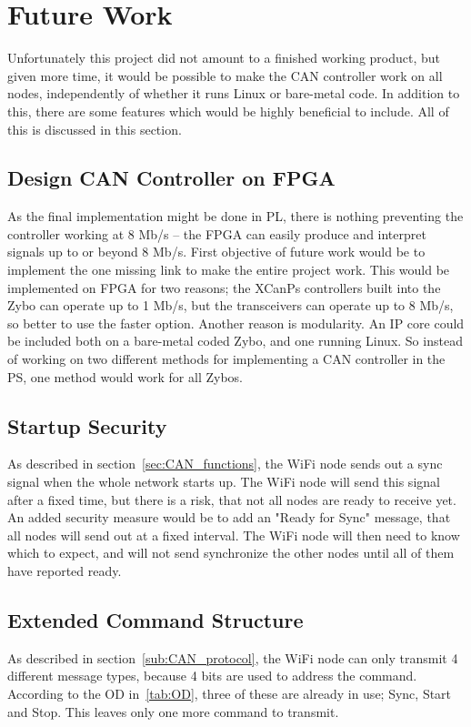 
\section{Future Work}\label{sec:future_work}
Unfortunately this project did not amount to a finished working product, but given more time, it would be possible to make the CAN controller work on all nodes, independently of whether it runs Linux or bare-metal code.
In addition to this, there are some features which would be  highly beneficial to include.
All of this is discussed in this section.

\subsection*{Design CAN Controller on FPGA}
As the final implementation might be done in PL, there is nothing preventing the controller working at 8 Mb/s -- the FPGA can easily produce and interpret signals up to or beyond 8 Mb/s.
First objective of future work would be to implement the one missing link to make the entire project work.
This would be implemented on FPGA for two reasons;
the XCanPs controllers built into the Zybo can operate up to 1 Mb/s, but the transceivers can operate up to 8 Mb/s, so better to use the faster option.
Another reason is modularity.
An IP core could be included both on a bare-metal coded Zybo, and one running Linux.
So instead of working on two different methods for implementing a CAN controller in the PS, one method would work for all Zybos.

\subsection*{Startup Security}
As described in section~\ref{sec:CAN_functions}, the WiFi node sends out a sync signal when the whole network starts up.
The WiFi node will send this signal after a fixed time, but there is a risk, that not all nodes are ready to receive yet. 
An added security measure would be to add an "Ready for Sync" message, that all nodes will send out at a fixed interval.
The WiFi node will then need to know which to expect, and will not send synchronize the other nodes until all of them have reported ready.

\subsection*{Extended Command Structure}
As described in section~\ref{sub:CAN_protocol}, the WiFi node can only transmit 4 different message types, because 4 bits are used to address the command. 
According to the OD in~\ref{tab:OD}, three of these are already in use; Sync, Start and Stop. 
This leaves only one more command to transmit.\\


